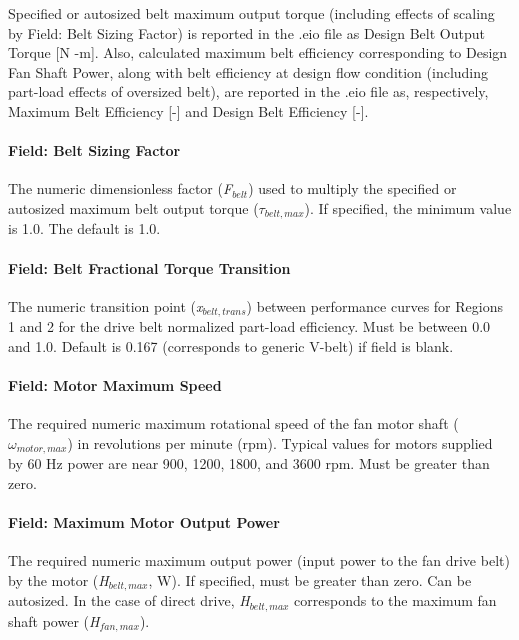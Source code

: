 Specified or autosized belt maximum output torque (including effects of scaling by Field: Belt Sizing Factor) is reported in the .eio file as Design Belt Output Torque {[}N -m{]}. Also, calculated maximum belt efficiency corresponding to Design Fan Shaft Power, along with belt efficiency at design flow condition (including part-load effects of oversized belt), are reported in the .eio file as, respectively, Maximum Belt Efficiency {[}-{]} and Design Belt Efficiency {[}-{]}.

\paragraph{Field: Belt Sizing Factor}\label{field-belt-sizing-factor}

The numeric dimensionless factor (\emph{F\(_{belt}\)}) used to multiply the specified or autosized maximum belt output torque (\(\tau_{belt,max}\)). If specified, the minimum value is 1.0. The default is 1.0.

\paragraph{Field: Belt Fractional Torque Transition}\label{field-belt-fractional-torque-transition}

The numeric transition point (\emph{x\(_{belt,trans}\)}) between performance curves for Regions 1 and 2 for the drive belt normalized part-load efficiency. Must be between 0.0 and 1.0. Default is 0.167 (corresponds to generic V-belt) if field is blank.

\paragraph{Field: Motor Maximum Speed}\label{field-motor-maximum-speed}

The required numeric maximum rotational speed of the fan motor shaft (\(\omega_{motor,max}\)) in revolutions per minute (rpm). Typical values for motors supplied by 60 Hz power are near 900, 1200, 1800, and 3600 rpm. Must be greater than zero.

\paragraph{Field: Maximum Motor Output Power}\label{field-maximum-motor-output-power}

The required numeric maximum output power (input power to the fan drive belt) by the motor (\emph{H\(_{belt,max}\)}, W). If specified, must be greater than zero. Can be autosized. In the case of direct drive, \emph{H\(_{belt,max}\)} corresponds to the maximum fan shaft power (\emph{H\(_{fan,max}\)}).

